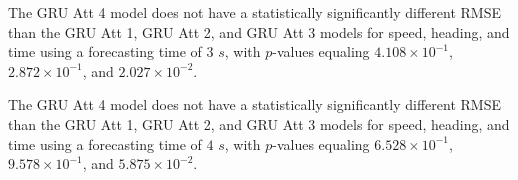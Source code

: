 The GRU Att 4 model does not have a statistically significantly different RMSE than the GRU Att 1, GRU Att 2, and GRU Att 3 models for speed, heading, and time using a forecasting time of $3$ $s$, with $p$-values equaling $4.108 \times 10^{-1}$, $2.872 \times 10^{-1}$, and $2.027 \times 10^{-2}$.

The GRU Att 4 model does not have a statistically significantly different RMSE than the GRU Att 1, GRU Att 2, and GRU Att 3 models for speed, heading, and time using a forecasting time of $4$ $s$, with $p$-values equaling $6.528 \times 10^{-1}$, $9.578 \times 10^{-1}$, and $5.875 \times 10^{-2}$.

